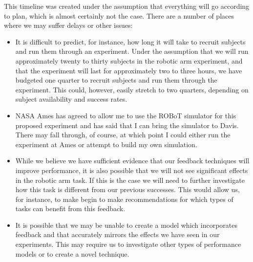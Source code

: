\documentclass[float=false, crop=false]{standalone}
\begin{document}
This timeline was created under the assumption that everything will go according to plan, which is almost certainly not the case.
There are a number of places where we may suffer delays or other issues:
\begin{itemize}
\item It is difficult to predict, for instance, how long it will take to recruit subjects and run them through an experiment.
Under the assumption that we will run approximately twenty to thirty subjects in the robotic arm experiment, and that the experiment will last for approximately two to three hours, we have budgeted one quarter to recruit subjects and run them through the experiment.
This could, however, easily stretch to two quarters, depending on subject availability and success rates.
\item NASA Ames has agreed to allow me to use the ROBoT simulator for this proposed experiment and has said that I can bring the simulator to Davis.
There may fall through, of course, at which point I could either run the experiment at Ames or attempt to build my own simulation.
\item While we believe we have sufficient evidence that our feedback techniques will improve performance, it is also possible that we will not see significant effects in the robotic arm task.
If this is the case we will need to further investigate how this task is different from our previous successes.
This would allow us, for instance, to make begin to make recommendations for which types of tasks can benefit from this feedback.
\item It is possible that we may be unable to create a model which incorporates feedback and that accurately mirrors the effects we have seen in our experiments. This may require us to investigate other types of performance models or to create a novel technique.
\end{itemize}
\end{document}
